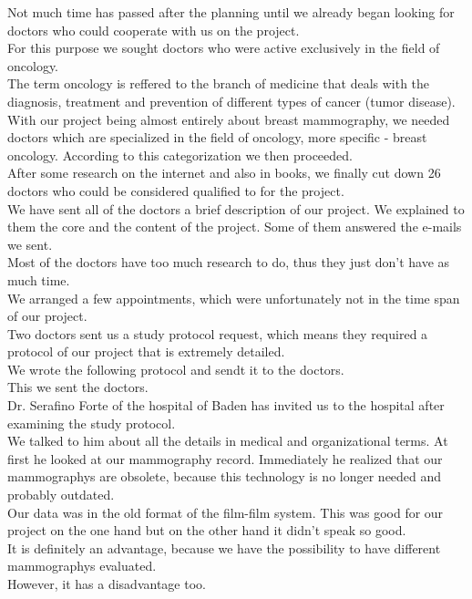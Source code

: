 Not much time has passed after the planning until we already began looking for doctors who could cooperate with us on the project. \\
For this purpose we sought doctors who were active exclusively in the field of oncology. \\
The term oncology is reffered to the branch of medicine that deals with the diagnosis, treatment and prevention of different types of cancer (tumor disease). \\
With our project being almost entirely about breast mammography, we needed doctors which are specialized in the field of oncology, more specific - breast oncology.  
According to this categorization we then proceeded.\\
After some research on the internet and also in books, we finally cut down 26 doctors who could be considered qualified to for the project. \\
We have sent all of the doctors a brief description of our project. We explained to them the core and the content of the project. Some of them answered the e-mails we sent.  \\
Most of the doctors have too much research to do, thus they just don't have as much time. \\
We arranged a few appointments, which were unfortunately not in the time span of our project. \\
Two doctors sent us a study protocol request, which means they required a protocol of our project that is extremely detailed. \\
We wrote the following protocol and sendt it to the doctors. \\
This we sent the doctors. \\
Dr. Serafino Forte of the hospital of Baden has invited us to the hospital after examining the study protocol. \\
We talked to him about all the details in medical and organizational terms. At first he looked at our mammography record. Immediately he realized that our mammographys are obsolete, because this technology is no longer needed and probably outdated. \\
Our data was in the old format of the film-film system. This was good for our project on the one hand but on the other hand it didn't speak so good. \\
It is definitely an advantage, because we have the possibility to have different mammographys evaluated. \\
However, it has a disadvantage too. \\
